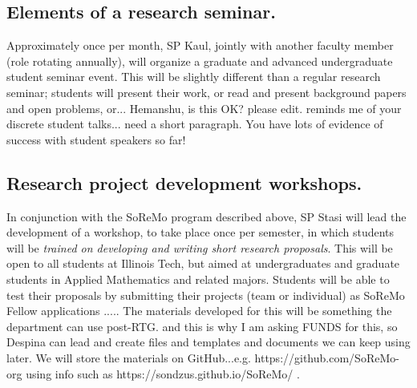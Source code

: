 \documentclass[11pt]{NSFamsart}
\begin{document}
\subsection*{Elements of a research seminar.} 
Approximately once per month, SP Kaul, jointly with another  faculty member (role rotating annually), will organize a graduate and advanced undergraduate student seminar event. This will be slightly different than a regular research seminar; students will present their work, or read and present background papers and open problems, or...{\color{magenta} Hemanshu, is this OK? please edit. reminds me of your discrete student talks... need a short paragraph. You have  lots of evidence of success with student speakers so far!} 

\subsection*{Research project development workshops.} 
In conjunction with the SoReMo program described above, SP Stasi will lead the development of a workshop, to take place once per semester, in which students will be \emph{trained on developing and writing short research proposals}. This will be open to all students at Illinois Tech, but aimed at undergraduates and graduate students in Applied Mathematics  and related majors. Students will be able to test their proposals by submitting their projects (team or individual) as SoReMo Fellow applications ..... The materials developed for this will be something the department can use post-RTG. {\color{magenta}and this is why I am asking FUNDS for this, so Despina can lead and create files and templates and documents we can keep using later. } We will store the materials on GitHub...e.g. https://github.com/SoReMo-org using info such as https://sondzus.github.io/SoReMo/  . 

\end{document}
